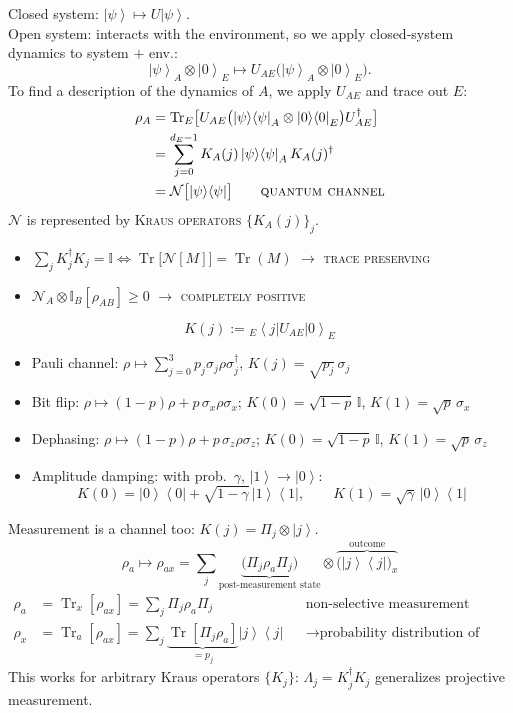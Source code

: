 \documentclass[11pt,a4paper]{article}
\renewcommand{\ket}[1]{\left|#1\right\rangle}
\renewcommand{\bra}[1]{\left\langle#1\right|}
\newcommand{\ketbra}[2]{\left|#1\right\rangle\!\left\langle#2\right|}
\newcommand{\Tr}{\operatorname{Tr}}
\newcommand{\id}{\mathbb{I}}
\begin{document}
Closed system: $\ket\psi\mapsto U\ket\psi$.\\
Open system: interacts with the environment, so we apply closed-system dynamics to system $+$ env.:
\[
\ket\psi_A\otimes\ket0_E\mapsto U_{AE}\bigl(\ket\psi_A\otimes\ket0_E\bigr).
\]
To find a description of the dynamics of $A$, we apply $U_{AE}$ and trace out $E$:
\begin{align*}
\rho_A &= \Tr_E\bigl[U_{AE}\bigl(\ketbra\psi\psi_A\otimes\ketbra00_E\bigr)U_{AE}^\dagger\bigr]\\
&= \sum_{j=0}^{d_E-1}K_A(j)\ketbra\psi\psi_AK_A(j)^\dagger\\
&= \mathcal N\bigl[\ketbra\psi\psi\bigr]\qquad\textsc{quantum channel}
\end{align*}
$\mathcal N$ is represented by \textsc{Kraus operators} $\{K_A(j)\}_j$.
\begin{itemize}
  \item $\sum_jK_j^\dagger K_j = \id \iff \Tr\bigl[\mathcal N[M]\bigr] = \Tr(M)$ \quad$\to$ \textsc{trace preserving}
  \item $\mathcal N_A\otimes\id_B[\rho_{AB}]\ge0$ \quad$\to$ \textsc{completely positive}
\end{itemize}
\[
K(j) := {}_E\!\bra{j}U_{AE}\ket0_E
\]
\begin{itemize}[label=$\to$]
  \item Pauli channel: $\rho\mapsto\sum_{j=0}^3p_j\sigma_j\rho\sigma_j^\dagger$, \quad $K(j) = \sqrt{p_j}\,\sigma_j$
  \item Bit flip: $\rho\mapsto(1-p)\rho + p\,\sigma_x\rho\sigma_x$; \quad $K(0) = \sqrt{1-p}\,\id$, $K(1) = \sqrt p\,\sigma_x$
  \item Dephasing: $\rho\mapsto(1-p)\rho + p\,\sigma_z\rho\sigma_z$; \quad $K(0) = \sqrt{1-p}\,\id$, $K(1) = \sqrt p\,\sigma_z$
  \item Amplitude damping: with prob.\ $\gamma$, $\ket1\to\ket0$:
  \[
  K(0) = \ketbra00 + \sqrt{1-\gamma}\,\ketbra11,\qquad K(1) = \sqrt\gamma\,\ketbra01
  \]
\end{itemize}

Measurement is a channel too: $K(j) = \Pi_j\otimes\ket j$.
\[
\rho_a\mapsto\rho_{ax} = \sum_j\underbrace{\bigl(\Pi_j\rho_a\Pi_j\bigr)}_{\text{post-measurement state}}\otimes\overbrace{\bigl(\ketbra jj\bigr)_x}^{\text{outcome}}
\]
\begin{align*}
\rho_a &= \Tr_x[\rho_{ax}] = \sum_j\Pi_j\rho_a\Pi_j &&\text{non-selective measurement}\\
\rho_x &= \Tr_a[\rho_{ax}] = \sum_j\underbrace{\Tr[\Pi_j\rho_a]}_{=p_j}\ketbra jj &&\to\text{probability distribution of outcomes}
\end{align*}
This works for arbitrary Kraus operators $\{K_j\}$: $\Lambda_j = K_j^\dagger K_j$ generalizes projective measurement.
\end{document}
